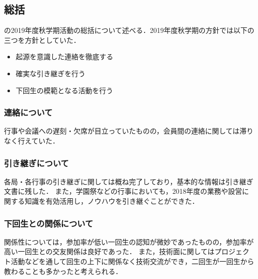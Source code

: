 \subsection*{\secondGrade{}総括}


\secondGrade{}の2019年度秋学期活動の総括について述べる．2019年度秋学期の方針では以下の三つを方針としていた．
\begin{itemize}
    \item 起源を意識した連絡を徹底する
    \item 確実な引き継ぎを行う
    \item 下回生の模範となる活動を行う

\end{itemize}

\subsubsection*{連絡について}
行事や会議への遅刻・欠席が目立っていたものの，会員間の連絡に関しては滞りなく行えていた． 
\subsubsection*{引き継ぎについて}
各局・各行事の引き継ぎに関しては概ね完了しており，基本的な情報は引き継ぎ文書に残した．
また，学園祭などの行事においても，2018年度の業務や設営に関する知識を有効活用し，ノウハウを引き継ぐことができた． 
\subsubsection*{下回生との関係について}
関係性については，参加率が低い一回生の認知が微妙であったものの，参加率が高い一回生との交友関係は良好であった．
また，技術面に関してはプロジェクト活動などを通して回生の上下に関係なく技術交流ができ，二回生が一回生から教わることも多かったと考えられる．